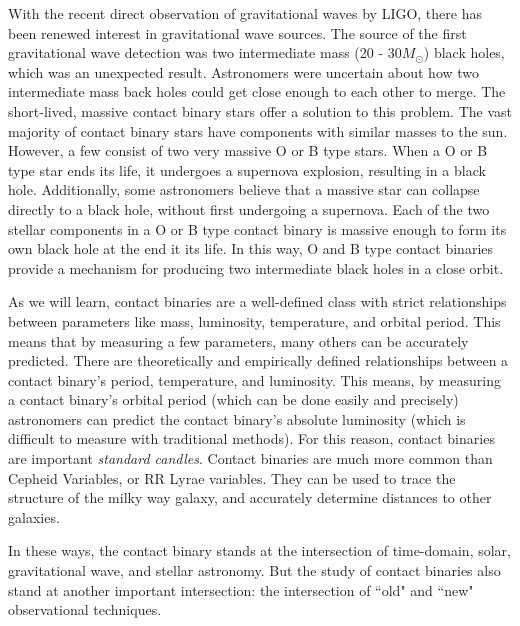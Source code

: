 \documentclass[12pt]{article} %
\numberwithin{equation}{section} %
\begin{document}

With the recent direct observation of gravitational waves by LIGO, there has been renewed interest in gravitational wave sources. The source of the first gravitational wave detection was two intermediate mass (20 - 30$M_{\odot}$) black holes, which was an unexpected result. Astronomers were uncertain about how two intermediate mass back holes could get close enough to each other to merge. The short-lived, massive contact binary stars offer a solution to this problem. The vast majority of contact binary stars have components with similar masses to the sun. However, a few consist of two very massive O or B type stars. When a O or B type star ends its life, it undergoes a supernova explosion, resulting in a black hole. Additionally, some astronomers believe that a massive star can collapse directly to a black hole, without first undergoing a supernova.  Each of the two stellar components in a O or B type contact binary is massive enough to form its own black hole at the end it its life. In this way, O and B type contact binaries provide a mechanism for producing two intermediate black holes in a close orbit.

As we will learn, contact binaries are a well-defined class with strict relationships between parameters like mass, luminosity, temperature, and orbital period. This means that by measuring a few parameters, many others can be accurately predicted. There are theoretically and empirically defined relationships between a contact binary's period, temperature, and luminosity. This means, by measuring a contact binary's orbital period (which can be done easily and precisely) astronomers can predict the contact binary's absolute luminosity (which is difficult to measure with traditional methods). For this reason, contact binaries are important \emph{standard candles}. Contact binaries are much more common than Cepheid Variables, or RR Lyrae variables. They can be used to trace the structure of the milky way galaxy, and accurately determine distances to other galaxies.

In these ways, the contact binary stands at the intersection of time-domain, solar, gravitational wave, and stellar astronomy. But the study of contact binaries also stand at another important intersection: the intersection of ``old" and ``new" observational techniques. 
\end{document}
